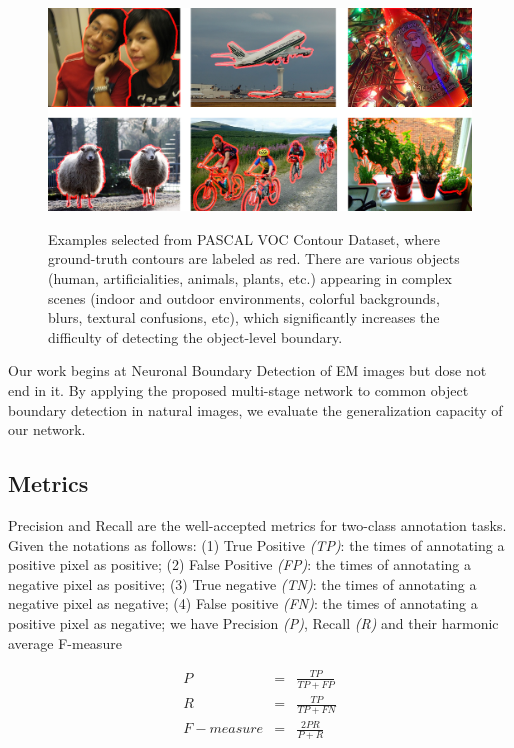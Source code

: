 \documentclass[senior]{IPSstyle}
\begin{document}
\begin{figure}[t]
  \centering
  \includegraphics[width=15cm]{voc_contour.png}\\
  \caption{Examples selected from PASCAL VOC Contour Dataset\cite{Yang2016}, where ground-truth contours are labeled as red. There are various objects (human, artificialities, animals, plants, etc.) appearing in complex scenes (indoor and outdoor environments, colorful backgrounds, blurs, textural confusions, etc), which significantly increases the difficulty of detecting the object-level boundary.}\label{voc contour}
\end{figure}

Our work begins at Neuronal Boundary Detection of EM images but dose not end in it. By applying the proposed multi-stage network to common object boundary detection in natural images, we evaluate the generalization capacity of our network.

\subsection{Metrics}
Precision and Recall are the well-accepted metrics for two-class annotation tasks\cite{Shen2016CVPR, Shen2017TIP, Yang2016}. Given the notations as follows: 
(1) True Positive \emph{(TP)}: the times of annotating a positive pixel as positive;
(2) False Positive \emph{(FP)}: the times of annotating a negative pixel as positive;
(3) True negative \emph{(TN)}: the times of annotating a negative pixel as negative;
(4) False positive \emph{(FN)}: the times of annotating a positive pixel as negative;
we have Precision \emph{(P)}, Recall \emph{(R)} and their harmonic average F-measure

\begin{eqnarray}
P &=& \frac{TP}{TP+FP} \\
R &=& \frac{TP}{TP+FN} \\
F-measure &=& \frac{2PR}{P+R} \\
\end{eqnarray}
\end{document}
